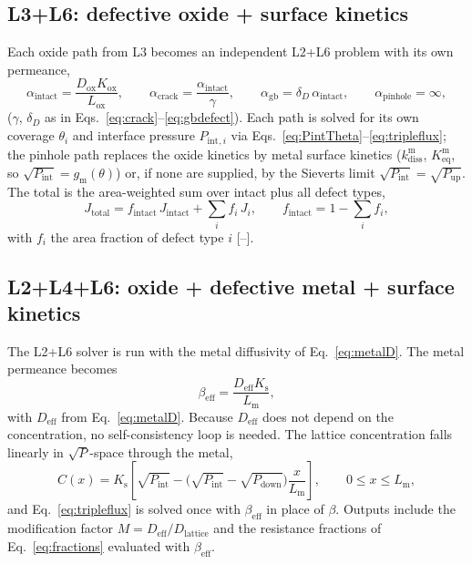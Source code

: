 \documentclass[11pt,a4paper]{article}
\newcommand{\Pup}{P_{\mathrm{up}}}
\newcommand{\Pdown}{P_{\mathrm{down}}}
\newcommand{\Pint}{P_{\mathrm{int}}}
\newcommand{\Ks}{K_{\mathrm{s}}}
\newcommand{\Kox}{K_{\mathrm{ox}}}
\newcommand{\Keq}{K_{\mathrm{eq}}}
\newcommand{\Dox}{D_{\mathrm{ox}}}
\newcommand{\Deff}{D_{\mathrm{eff}}}
\newcommand{\Lm}{L_{\mathrm{m}}}
\newcommand{\Lox}{L_{\mathrm{ox}}}
\newcommand{\kdiss}{k_{\mathrm{diss}}}
\begin{document}
\subsection{L3+L6: defective oxide + surface kinetics}

Each oxide path from L3 becomes an independent L2+L6 problem with its own
permeance,
\begin{equation}
  \alpha_{\mathrm{intact}} = \frac{\Dox\Kox}{\Lox}, \qquad
  \alpha_{\mathrm{crack}} = \frac{\alpha_{\mathrm{intact}}}{\gamma}, \qquad
  \alpha_{\mathrm{gb}} = \delta_D\,\alpha_{\mathrm{intact}}, \qquad
  \alpha_{\mathrm{pinhole}} = \infty,
  \label{eq:alphapaths}
\end{equation}
($\gamma$, $\delta_D$ as in Eqs.~\eqref{eq:crack}--\eqref{eq:gbdefect}). Each
path is solved for its own coverage $\theta_i$ and interface pressure
$\Pint{}_{,i}$ via Eqs.~\eqref{eq:PintTheta}--\eqref{eq:tripleflux}; the
pinhole path replaces the oxide kinetics by metal surface kinetics
($\kdiss^{\mathrm{m}}$, $\Keq^{\mathrm{m}}$, so $\sqrt{\Pint} = g_{\mathrm{m}}(\theta)$)
or, if none are supplied, by the Sieverts limit $\sqrt{\Pint} = \sqrt{\Pup}$.
The total is the area-weighted sum over intact plus all defect types,
\begin{equation}
  J_{\mathrm{total}} = f_{\mathrm{intact}}\,J_{\mathrm{intact}}
                     + \sum_i f_i\, J_i,
  \qquad f_{\mathrm{intact}} = 1 - \sum_i f_i,
  \label{eq:L3L6total}
\end{equation}
with $f_i$ the area fraction of defect type $i$ [--].

\subsection{L2+L4+L6: oxide + defective metal + surface kinetics}

The L2+L6 solver is run with the metal diffusivity of Eq.~\eqref{eq:metalD}.
The metal permeance becomes
\begin{equation}
  \beta_{\mathrm{eff}} = \frac{\Deff \Ks}{\Lm},
  \label{eq:betaeff}
\end{equation}
with $\Deff$ from Eq.~\eqref{eq:metalD}. Because $\Deff$ does not depend on the
concentration, no self-consistency loop is needed. The lattice concentration falls
linearly in $\sqrt{P}$-space through the metal,
\begin{equation}
  C(x) = \Ks\left[\sqrt{\Pint} - \bigl(\sqrt{\Pint} - \sqrt{\Pdown}\bigr)\frac{x}{\Lm}\right],
  \qquad 0 \le x \le \Lm,
  \label{eq:profile}
\end{equation}
and Eq.~\eqref{eq:tripleflux} is solved once with $\beta_{\mathrm{eff}}$ in place of
$\beta$. Outputs include the modification factor
$M = \Deff/D_{\mathrm{lattice}}$ and the resistance fractions of
Eq.~\eqref{eq:fractions} evaluated with $\beta_{\mathrm{eff}}$.
\end{document}
